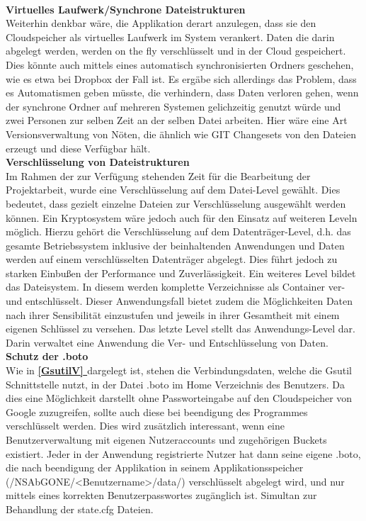 \documentclass[12pt,a4paper,bibliography=totocnumbered,listof=totocnumbered]{scrartcl}
\newcommand*{\fullref}[1]{\textbf{\hyperref[{#1}]{\ref*{#1} \nameref*{#1}}}}
\begin{document}
\\\textbf{Virtuelles Laufwerk/Synchrone Dateistrukturen}\\
Weiterhin denkbar wäre, die Applikation derart anzulegen, dass sie den Cloudspeicher als virtuelles Laufwerk im System verankert. Daten die darin abgelegt werden, werden on the fly verschlüsselt und in der Cloud gespeichert. Dies könnte auch mittels eines automatisch synchronisierten Ordners geschehen, wie es etwa bei Dropbox der Fall ist. Es ergäbe sich allerdings das Problem, dass es Automatismen geben müsste, die verhindern, dass Daten verloren gehen, wenn der synchrone Ordner auf mehreren Systemen gelichzeitig genutzt würde und zwei Personen zur selben Zeit an der selben Datei arbeiten. Hier wäre eine Art Versionsverwaltung von Nöten, die ähnlich wie GIT Changesets von den Dateien erzeugt und diese Verfügbar hält.
\\\textbf{Verschlüsselung von Dateistrukturen}\\
Im Rahmen der zur Verfügung stehenden Zeit für die Bearbeitung der Projektarbeit, wurde eine Verschlüsselung auf dem Datei-Level gewählt. Dies bedeutet, dass gezielt einzelne Dateien zur Verschlüsselung ausgewählt werden können. Ein Kryptosystem wäre jedoch auch für den Einsatz auf weiteren Leveln möglich. Hierzu gehört die Verschlüsselung auf dem Datenträger-Level, d.h. das gesamte Betriebssystem inklusive der beinhaltenden Anwendungen und Daten werden auf einem verschlüsselten Datenträger abgelegt. Dies führt jedoch zu starken Einbußen der Performance und Zuverlässigkeit. Ein weiteres Level bildet das Dateisystem. In diesem werden komplette Verzeichnisse als Container ver- und entschlüsselt. Dieser Anwendungsfall bietet zudem die Möglichkeiten Daten nach ihrer Sensibilität einzustufen und jeweils in ihrer Gesamtheit mit einem eigenen Schlüssel zu versehen. Das letzte Level stellt das Anwendungs-Level dar. Darin verwaltet eine Anwendung die Ver- und Entschlüsselung von Daten. \cite{38}
\\\textbf{Schutz der .boto}\\
Wie in \fullref{GsutilV} dargelegt ist, stehen die Verbindungsdaten, welche die Gsutil Schnittstelle nutzt, in der Datei .boto im Home Verzeichnis des Benutzers. Da dies eine Möglichkeit darstellt ohne Passworteingabe auf den Cloudspeicher von Google zuzugreifen, sollte auch diese bei beendigung des Programmes verschlüsselt werden. Dies wird zusätzlich interessant, wenn eine Benutzerverwaltung mit eigenen Nutzeraccounts und zugehörigen Buckets existiert. Jeder in der Anwendung registrierte Nutzer hat dann seine eigene .boto, die nach beendigung der Applikation in seinem Applikationsspeicher (/NSAbGONE/\textless Benutzername\textgreater /data/) verschlüsselt abgelegt wird, und nur mittels eines korrekten Benutzerpasswortes zugänglich ist. Simultan zur Behandlung der state.cfg Dateien.
\end{document}
